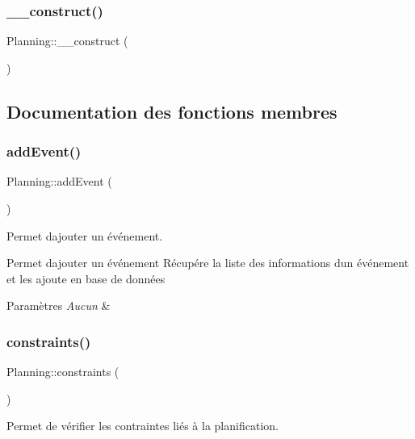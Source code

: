 \subsubsection{\texorpdfstring{\+\_\+\+\_\+construct()}{\_\_construct()}}
{\footnotesize\ttfamily Planning\+::\+\_\+\+\_\+construct (\begin{DoxyParamCaption}{ }\end{DoxyParamCaption})}



\subsection{Documentation des fonctions membres}
\mbox{\label{class_planning_a84bf8d328b55382259fb2b7fc20de09a}} 
\subsubsection{\texorpdfstring{add\+Event()}{addEvent()}}
{\footnotesize\ttfamily Planning\+::add\+Event (\begin{DoxyParamCaption}{ }\end{DoxyParamCaption})}



Permet d\textquotesingle{}ajouter un événement. 

Permet d\textquotesingle{}ajouter un événement Récupére la liste des informations d\textquotesingle{}un événement et les ajoute en base de données 
\begin{DoxyParams}{Paramètres}
{\em Aucun} & \\
\hline
\end{DoxyParams}
\mbox{\label{class_planning_ac05390330a3ae8718841eeb0a641c59d}} 
\subsubsection{\texorpdfstring{constraints()}{constraints()}}
{\footnotesize\ttfamily Planning\+::constraints (\begin{DoxyParamCaption}{ }\end{DoxyParamCaption})}



Permet de vérifier les contraintes liés à la planification. 

